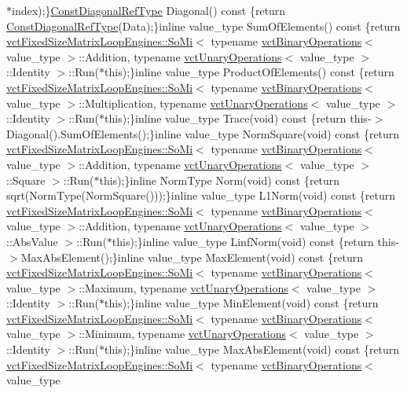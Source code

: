 \begin{DoxyCompactItemize}
$\ast$index);\}\hyperlink{classvct_fixed_size_const_matrix_base_a54699d7dbe28072365fab4aa99c68d66}{Const\+Diagonal\+Ref\+Type} Diagonal() const \{return \hyperlink{classvct_fixed_size_const_matrix_base_a54699d7dbe28072365fab4aa99c68d66}{Const\+Diagonal\+Ref\+Type}(Data);\}inline value\+\_\+type Sum\+Of\+Elements() const \{return \hyperlink{classvct_fixed_size_matrix_loop_engines_1_1_so_mi}{vct\+Fixed\+Size\+Matrix\+Loop\+Engines\+::\+So\+Mi}$<$ typename \hyperlink{classvct_binary_operations}{vct\+Binary\+Operations}$<$ value\+\_\+type $>$\+::Addition, typename \hyperlink{classvct_unary_operations}{vct\+Unary\+Operations}$<$ value\+\_\+type $>$\+::Identity $>$\+::Run($\ast$this);\}inline value\+\_\+type Product\+Of\+Elements() const \{return \hyperlink{classvct_fixed_size_matrix_loop_engines_1_1_so_mi}{vct\+Fixed\+Size\+Matrix\+Loop\+Engines\+::\+So\+Mi}$<$ typename \hyperlink{classvct_binary_operations}{vct\+Binary\+Operations}$<$ value\+\_\+type $>$\+::Multiplication, typename \hyperlink{classvct_unary_operations}{vct\+Unary\+Operations}$<$ value\+\_\+type $>$\+::Identity $>$\+::Run($\ast$this);\}inline value\+\_\+type Trace(void) const \{return this-\/$>$Diagonal().Sum\+Of\+Elements();\}inline value\+\_\+type Norm\+Square(void) const \{return \hyperlink{classvct_fixed_size_matrix_loop_engines_1_1_so_mi}{vct\+Fixed\+Size\+Matrix\+Loop\+Engines\+::\+So\+Mi}$<$ typename \hyperlink{classvct_binary_operations}{vct\+Binary\+Operations}$<$ value\+\_\+type $>$\+::Addition, typename \hyperlink{classvct_unary_operations}{vct\+Unary\+Operations}$<$ value\+\_\+type $>$\+::Square $>$\+::Run($\ast$this);\}inline Norm\+Type Norm(void) const \{return sqrt(Norm\+Type(Norm\+Square()));\}inline value\+\_\+type L1\+Norm(void) const \{return \hyperlink{classvct_fixed_size_matrix_loop_engines_1_1_so_mi}{vct\+Fixed\+Size\+Matrix\+Loop\+Engines\+::\+So\+Mi}$<$ typename \hyperlink{classvct_binary_operations}{vct\+Binary\+Operations}$<$ value\+\_\+type $>$\+::Addition, typename \hyperlink{classvct_unary_operations}{vct\+Unary\+Operations}$<$ value\+\_\+type $>$\+::Abs\+Value $>$\+::Run($\ast$this);\}inline value\+\_\+type Linf\+Norm(void) const \{return this-\/$>$Max\+Abs\+Element();\}inline value\+\_\+type Max\+Element(void) const \{return \hyperlink{classvct_fixed_size_matrix_loop_engines_1_1_so_mi}{vct\+Fixed\+Size\+Matrix\+Loop\+Engines\+::\+So\+Mi}$<$ typename \hyperlink{classvct_binary_operations}{vct\+Binary\+Operations}$<$ value\+\_\+type $>$\+::Maximum, typename \hyperlink{classvct_unary_operations}{vct\+Unary\+Operations}$<$ value\+\_\+type $>$\+::Identity $>$\+::Run($\ast$this);\}inline value\+\_\+type Min\+Element(void) const \{return \hyperlink{classvct_fixed_size_matrix_loop_engines_1_1_so_mi}{vct\+Fixed\+Size\+Matrix\+Loop\+Engines\+::\+So\+Mi}$<$ typename \hyperlink{classvct_binary_operations}{vct\+Binary\+Operations}$<$ value\+\_\+type $>$\+::Minimum, typename \hyperlink{classvct_unary_operations}{vct\+Unary\+Operations}$<$ value\+\_\+type $>$\+::Identity $>$\+::Run($\ast$this);\}inline value\+\_\+type Max\+Abs\+Element(void) const \{return \hyperlink{classvct_fixed_size_matrix_loop_engines_1_1_so_mi}{vct\+Fixed\+Size\+Matrix\+Loop\+Engines\+::\+So\+Mi}$<$ typename \hyperlink{classvct_binary_operations}{vct\+Binary\+Operations}$<$ value\+\_\+type 
\end{DoxyCompactItemize}
